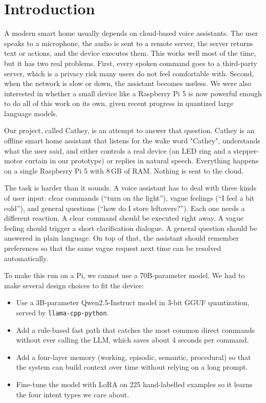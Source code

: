 \documentclass[conference]{IEEEtran}
\begin{document}
\section{Introduction}

A modern smart home usually depends on cloud-based voice assistants. The user speaks to a microphone, the audio is sent to a remote server, the server returns text or actions, and the device executes them. This works well most of the time, but it has two real problems. First, every spoken command goes to a third-party server, which is a privacy risk many users do not feel comfortable with. Second, when the network is slow or down, the assistant becomes useless. We were also interested in whether a small device like a Raspberry Pi 5 is now powerful enough to do all of this work on its own, given recent progress in quantized large language models.

Our project, called Cathey, is an attempt to answer that question. Cathey is an offline smart home assistant that listens for the wake word "Cathey", understands what the user said, and either controls a real device (an LED ring and a stepper-motor curtain in our prototype) or replies in natural speech. Everything happens on a single Raspberry Pi 5 with 8\,GB of RAM. Nothing is sent to the cloud.

The task is harder than it sounds. A voice assistant has to deal with three kinds of user input: clear commands (``turn on the light''), vague feelings (``I feel a bit cold''), and general questions (``how do I store leftovers?''). Each one needs a different reaction. A clear command should be executed right away. A vague feeling should trigger a short clarification dialogue. A general question should be answered in plain language. On top of that, the assistant should remember preferences so that the same vague request next time can be resolved automatically.

To make this run on a Pi, we cannot use a 70B-parameter model. We had to make several design choices to fit the device:
\begin{itemize}
    \item Use a 3B-parameter Qwen2.5-Instruct model in 3-bit GGUF quantization, served by \texttt{llama-cpp-python}.
    \item Add a rule-based fast path that catches the most common direct commands without ever calling the LLM, which saves about 4 seconds per command.
    \item Add a four-layer memory (working, episodic, semantic, procedural) so that the system can build context over time without relying on a long prompt.
    \item Fine-tune the model with LoRA on 225 hand-labelled examples so it learns the four intent types we care about.
\end{itemize}
\end{document}
